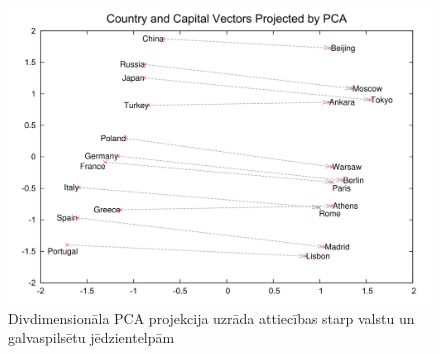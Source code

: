 \begin{figure}[h]
	\centering
	\includegraphics[width=\textwidth]{figures/word2vec-country-capital.png}
	\caption{Divdimensionāla PCA projekcija uzrāda attiecības starp valstu un galvaspilsētu jēdzientelpām}
\end{figure}

